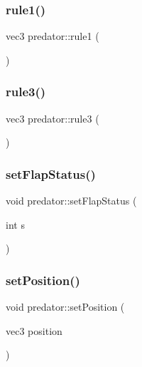 \mbox{\label{classpredator_a676a00f3fcf0231ee203561bb63db10d}} 
\subsubsection{\texorpdfstring{rule1()}{rule1()}}
{\footnotesize\ttfamily vec3 predator\+::rule1 (\begin{DoxyParamCaption}{ }\end{DoxyParamCaption})}

\mbox{\label{classpredator_a65ea796e88837cd3d894a268f90160b5}} 
\subsubsection{\texorpdfstring{rule3()}{rule3()}}
{\footnotesize\ttfamily vec3 predator\+::rule3 (\begin{DoxyParamCaption}{ }\end{DoxyParamCaption})}

\mbox{\label{classpredator_ac62b9ec636df79dabf4201c46071b7ba}} 
\subsubsection{\texorpdfstring{set\+Flap\+Status()}{setFlapStatus()}}
{\footnotesize\ttfamily void predator\+::set\+Flap\+Status (\begin{DoxyParamCaption}\item[{int}]{s }\end{DoxyParamCaption})}

\mbox{\label{classpredator_a3fa4db231bb9b2c509629488e93dee75}} 
\subsubsection{\texorpdfstring{set\+Position()}{setPosition()}}
{\footnotesize\ttfamily void predator\+::set\+Position (\begin{DoxyParamCaption}\item[{vec3}]{position }\end{DoxyParamCaption})}

